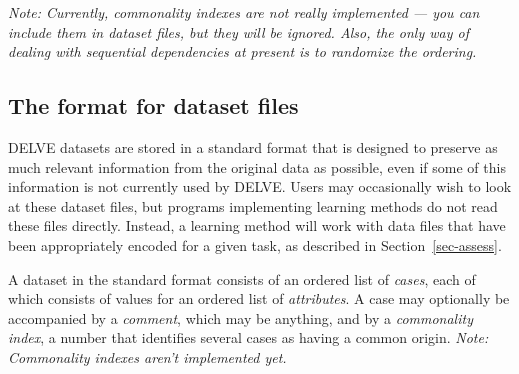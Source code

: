 {\em Note: Currently, commonality indexes are not really implemented ---
you can include them in \delve{} dataset files, but they will be ignored.
Also, the only way of dealing with sequential dependencies at present 
is to randomize the ordering.}


\subsection{The \delve{} format for dataset files}\label{data-format}

DELVE datasets are stored in a standard format that is designed to
preserve as much relevant information from the original data as
possible, even if some of this information is not currently used by
DELVE.  Users may occasionally wish to look at these dataset files,
but programs implementing learning methods do not read these files
directly.  Instead, a learning method will work with data files that
have been appropriately encoded for a given task, as described in
Section~\ref{sec-assess}.

A dataset in the \delve{} standard format consists of an ordered list of
\emph{cases}, each of which consists of values for an ordered list of
\emph{attributes}.  A case may optionally be accompanied by a
\emph{comment}, which may be anything, and by a \emph{commonality
index}, a number that identifies several cases as having a common
origin.  \emph{Note: Commonality indexes aren't implemented\nolinebreak{} yet.}

